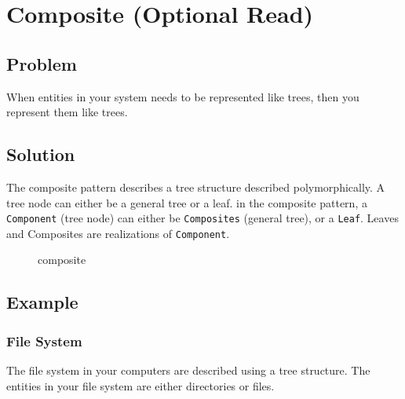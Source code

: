 \section{Composite (Optional
Read)}\label{structural-patterns.md__composite-optional-read}

\subsection{Problem}\label{structural-patterns.md__problem-2}

When entities in your system needs to be represented like trees, then
you represent them like trees.

\subsection{Solution}\label{structural-patterns.md__solution-2}

The composite pattern describes a tree structure described
polymorphically. A tree node can either be a general tree or a leaf. in
the composite pattern, a \texttt{Component} (tree node) can either be
\texttt{Composites} (general tree), or a \texttt{Leaf}. Leaves and
Composites are realizations of \texttt{Component}.

\begin{figure}
\centering
{}
\caption{composite}
\end{figure}

\subsection{Example}\label{structural-patterns.md__example-2}

\subsubsection{File System}\label{structural-patterns.md__file-system}

The file system in your computers are described using a tree structure.
The entities in your file system are either directories or files.

